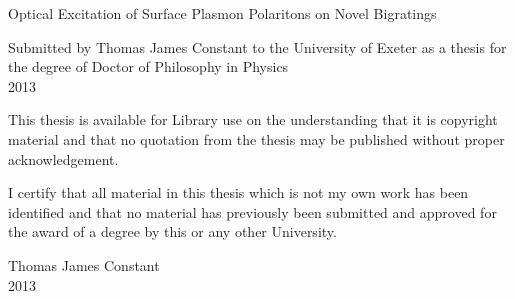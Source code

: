 %
%
%

\begin{center}
\thispagestyle{empty}
\vspace*{3cm} {\Huge Optical Excitation of Surface Plasmon Polaritons on Novel Bigratings}

\vspace*{2cm} {\large Submitted by Thomas James Constant to the University of Exeter as a thesis for the degree of Doctor of Philosophy in Physics\\ 2013}

\end{center}

\vspace{2cm} {This thesis is available for Library use on the understanding that it is copyright material and that no quotation from the thesis may be published without proper acknowledgement.}

\vspace{1cm} {I certify that all material in this thesis which is not my own work has been identified and that no material has previously been submitted and approved for the award of a degree by this or any other University.}

\begin{flushright}
\vspace{1cm} {Thomas James Constant\\ 2013}
\end{flushright}

\newpage

